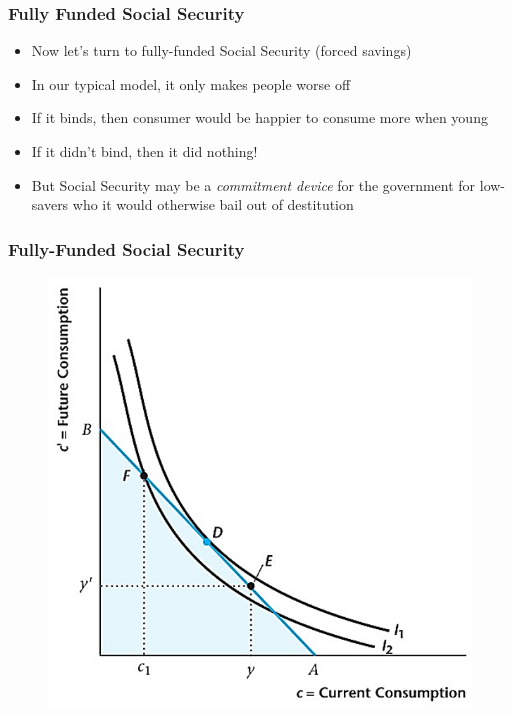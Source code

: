 \documentclass{beamer}
\begin{document}
 \begin{frame}
\frametitle[alignment=center]{Fully Funded Social Security}
\begin{itemize}
\item Now let's turn to fully-funded Social Security (forced savings)
\bigskip
\item In our typical model, it only makes people worse off
\bigskip
\item If it binds, then consumer would be happier to consume more when young
\bigskip
\item If it didn't bind, then it did nothing!
\bigskip
\item But Social Security may be a \emph{commitment device} for the government for low-savers who it would otherwise bail out of destitution
\end{itemize}
 \end{frame}

\begin{frame}
\frametitle[alignment=center]{Fully-Funded Social Security}
\begin{figure}
\centering
\includegraphics[scale=0.5]{Figures/W_Fig_10pt10.png}
\end{figure}
 \end{frame}
\end{document}
